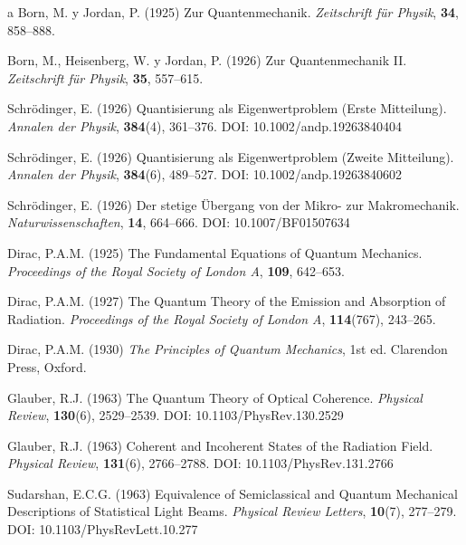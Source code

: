 \documentclass[11pt,a4paper,spanish]{book}
\begin{document}
\begin{thebibliography}{a}
 Born, M. y Jordan, P. (1925) Zur Quantenmechanik. \textit{Zeitschrift für Physik}, \textbf{34}, 858--888.

 Born, M., Heisenberg, W. y Jordan, P. (1926) Zur Quantenmechanik II. \textit{Zeitschrift für Physik}, \textbf{35}, 557--615.

 Schrödinger, E. (1926) Quantisierung als Eigenwertproblem (Erste Mitteilung). \textit{Annalen der Physik}, \textbf{384}(4), 361--376. DOI: 10.1002/andp.19263840404

 Schrödinger, E. (1926) Quantisierung als Eigenwertproblem (Zweite Mitteilung). \textit{Annalen der Physik}, \textbf{384}(6), 489--527. DOI: 10.1002/andp.19263840602

 Schrödinger, E. (1926) Der stetige Übergang von der Mikro- zur Makromechanik. \textit{Naturwissenschaften}, \textbf{14}, 664--666. DOI: 10.1007/BF01507634

 Dirac, P.A.M. (1925) The Fundamental Equations of Quantum Mechanics. \textit{Proceedings of the Royal Society of London A}, \textbf{109}, 642--653.

 Dirac, P.A.M. (1927) The Quantum Theory of the Emission and Absorption of Radiation. \textit{Proceedings of the Royal Society of London A}, \textbf{114}(767), 243--265.

 Dirac, P.A.M. (1930) \emph{The Principles of Quantum Mechanics}, 1st ed. Clarendon Press, Oxford.

 Glauber, R.J. (1963) The Quantum Theory of Optical Coherence. \textit{Physical Review}, \textbf{130}(6), 2529--2539. DOI: 10.1103/PhysRev.130.2529

 Glauber, R.J. (1963) Coherent and Incoherent States of the Radiation Field. \textit{Physical Review}, \textbf{131}(6), 2766--2788. DOI: 10.1103/PhysRev.131.2766

 Sudarshan, E.C.G. (1963) Equivalence of Semiclassical and Quantum Mechanical Descriptions of Statistical Light Beams. \textit{Physical Review Letters}, \textbf{10}(7), 277--279. DOI: 10.1103/PhysRevLett.10.277



\end{thebibliography}
\end{document}
